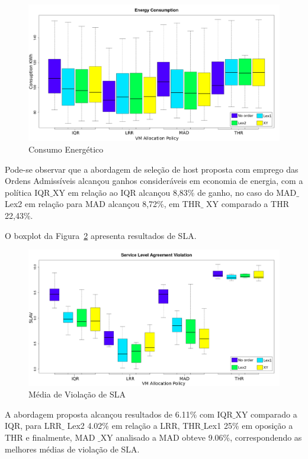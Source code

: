 \documentclass[tcc,capa]{texufpel}
\begin{document}
\begin{figure}[h]
\centering
\includegraphics[scale=0.18]{images/energy5_fuzz_ieee_2019.png} %
\caption{Consumo Energético}
\label{fig:EvaEnergy}
\end{figure}

Pode-se observar que a abordagem de seleção de host proposta com emprego das Ordens Admissíveis alcançou ganhos consideráveis em economia de energia, com a política IQR$\_$XY em relação ao IQR alcançou 8,83\% de ganho, no caso do MAD$\_$Lex2 em relação para MAD alcançou 8,72\%, em THR$\_$ XY comparado a THR 22,43\%.


O boxplot da Figura~\ref{fig:EvaSLA} apresenta resultados de SLA.

\begin{figure}[h]
\centering
\includegraphics[scale=0.18]{images/slav4_fuzz_ieee_2019.png} %
\caption{Média de Violação de SLA}
\label{fig:EvaSLA}
\end{figure}

A abordagem proposta alcançou resultados de 6.11\% com IQR$\_$XY comparado a IQR, para LRR$\_$ Lex2 4.02\% em relação a LRR, THR$\_$Lex1 25\% em oposição a THR e finalmente, MAD $\_$XY analisado a MAD obteve 9.06\%, correspondendo as melhores médias de violação de SLA.
\end{document}
